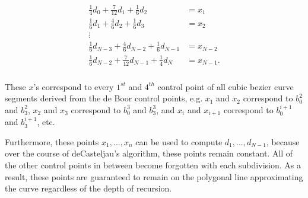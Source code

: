 \documentclass[paper=a4, fontsize=11pt]{scrartcl} %
\begin{document}
\begin{align*}
    \begin{split}
        \frac{1}{4}d_{0} + \frac{7}{12}d_{1} + \frac{1}{6}d_{2} &= x_{1}\\
        \frac{1}{6}d_{1} + \frac{4}{6}d_{2} + \frac{1}{6}d_{3} &= x_{2}\\
        \vdots\\
        \frac{1}{6}d_{N-3} + \frac{4}{6}d_{N-2} + \frac{1}{6}d_{N-1} &= x_{N-2}\\
        \frac{1}{6}d_{N-2} + \frac{7}{12}d_{N-1} + \frac{1}{4}d_{N} &= x_{N-1}.\\
    \end{split}
\end{align*}

These $x$'s correspond to every $1^{st}$ and $4^{th}$ control point of all
cubic bezier curve segments derived from the de Boor control points, e.g.
$x_{1}$ and $x_{2}$ correspond to $b_{0}^{2}$ and $b_{3}^{2}$, $x_{2}$ and
$x_{3}$ correspond to $b_{0}^{3}$ and $b_{3}^{3}$, and $x_{i}$ and $x_{i+1}$
correspond to $b_{0}^{i+1}$ and $b_{3}^{i+1}$, etc. 

\bigskip
Furthermore, these points $x_{1}, ..., x_{n}$ can be used to compute $d_{1},
... , d_{N-1}$, because over the course of deCasteljau's algorithm, these
points remain constant. All of the other control points in between become
forgotten with each subdivision. As a result, these points are guaranteed to
remain on the polygonal line approximating the curve regardless of the depth
of recursion. 
\end{document}
